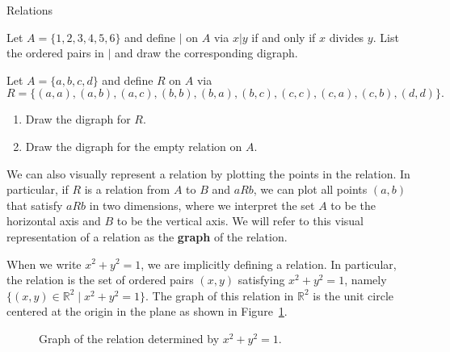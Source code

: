 \begin{section}{Relations}
\begin{problem}\label{prob:divides}
Let $A=\{1,2,3,4,5,6\}$ and define $|$ on $A$ via $x|y$ if and only if $x$ divides $y$.  List the ordered pairs in $|$ and draw the corresponding digraph.
\end{problem}

\begin{problem}\label{prob:another relation on finite}
Let $A=\{a,b,c,d\}$ and define $R$ on $A$ via
\[
{R}=\{(a,a),(a,b),(a,c),(b,b),(b,a),(b,c),(c,c),(c,a),(c,b),(d,d)\}.
\]  
\begin{enumerate}[label=\textrm{(\alph*)}]
\item Draw the digraph for $R$.
\item Draw the digraph for the empty relation on $A$.
\end{enumerate}
\end{problem}


We can also visually represent a relation by plotting the points in the relation.  In particular, if $R$ is a relation from $A$ to $B$ and $aR b$, we can plot all points $(a,b)$ that satisfy $aR b$ in two dimensions, where we interpret the set $A$ to be the horizontal axis and $B$ to be the vertical axis. We will refer to this visual representation of a relation as the \textbf{graph} of the relation.

\begin{example}\label{ex:circle}
When we write $x^2+y^2=1$, we are implicitly defining a relation.  In particular, the relation is the set of ordered pairs $(x,y)$ satisfying $x^2+y^2=1$, namely $\{(x,y)\in \mathbb{R}^2 \mid x^2+y^2=1\}$. The graph of this relation in $\mathbb{R}^2$ is the unit circle centered at the origin in the plane as shown in Figure~\ref{fig:unit circle}.
\end{example}

\begin{figure}[h!]
\centering
{}
\caption{Graph of the relation determined by $x^2+y^2=1$.}\label{fig:unit circle}
\end{figure}


\end{section}
